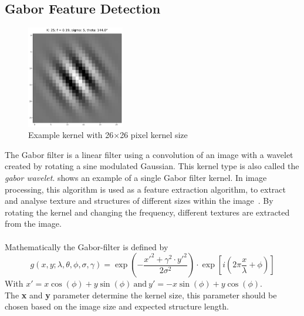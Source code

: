 \documentclass[12pt,a4paper, english,twoside]{scrartcl}
\begin{document}
    \subsection{Gabor Feature Detection}\label{sec:gabor}
      \begin{figure}
      \vspace{-1cm}
       \begin{center}
         \includegraphics[width=0.38\textwidth]{img/KLarge.png}
       \end{center}
       \caption{Example kernel with 26$\times$26 pixel kernel size}\label{fig:largeKernel}
      \end{figure}
      The Gabor filter is a linear filter using a convolution of an image with a wavelet created by rotating a sine modulated Gaussian. 
      This kernel type is also called the \textit{gabor wavelet}.
       shows an example of a single Gabor filter kernel.
      In image processing, this algorithm is used as a feature extraction algorithm, to extract and analyse texture and structures of different sizes within the image~\autocite{Cerdan1993}. 
      By rotating the kernel and changing the frequency, different textures are extracted from the image.\\ \\ 
      Mathematically the Gabor-filter is defined by
      \begin{equation}
        g(x,y; \lambda, \theta, \phi, \sigma, \gamma) = \exp \left(- \frac{x'^2 + \gamma^2\cdot y'^2}{2\sigma^2}\right) \cdot \exp \left[i \left(2\pi\frac{x}{\lambda} + \phi \right)\right] 
      \end{equation}
      With $ x' = x \cos(\phi) + y \sin(\phi)~\text{and}~y' = -x \sin(\phi) + y \cos(\phi)$.\\ 
      The \textbf{x} and \textbf{y} parameter determine the kernel size, this parameter should be chosen based on the image size and expected structure length.\\
\end{document}
